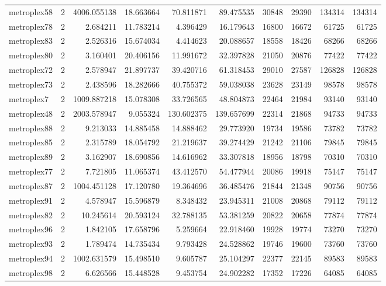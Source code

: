 \begin{longtable}{|l|r|r|r|r|r|r|r|r|r|}
metroplex58 & 2 & 4006.055138 & 18.663664 & 70.811871 & 89.475535 & 30848 & 29390 & 134314 & 134314 \\
metroplex78 & 2 & 2.684211 & 11.783214 & 4.396429 & 16.179643 & 16800 & 16672 & 61725 & 61725 \\
metroplex83 & 2 & 2.526316 & 15.674034 & 4.414623 & 20.088657 & 18558 & 18426 & 68266 & 68266 \\
metroplex80 & 2 & 3.160401 & 20.406156 & 11.991672 & 32.397828 & 21050 & 20876 & 77422 & 77422 \\
metroplex72 & 2 & 2.578947 & 21.897737 & 39.420716 & 61.318453 & 29010 & 27587 & 126828 & 126828 \\
metroplex73 & 2 & 2.438596 & 18.282666 & 40.755372 & 59.038038 & 23628 & 23149 & 98578 & 98578 \\
metroplex7 & 2 & 1009.887218 & 15.078308 & 33.726565 & 48.804873 & 22464 & 21984 & 93140 & 93140 \\
metroplex48 & 2 & 2003.578947 & 9.055324 & 130.602375 & 139.657699 & 22314 & 21868 & 94733 & 94733 \\
metroplex88 & 2 & 9.213033 & 14.885458 & 14.888462 & 29.773920 & 19734 & 19586 & 73782 & 73782 \\
metroplex85 & 2 & 2.315789 & 18.054792 & 21.219637 & 39.274429 & 21242 & 21106 & 79845 & 79845 \\
metroplex89 & 2 & 3.162907 & 18.690856 & 14.616962 & 33.307818 & 18956 & 18798 & 70310 & 70310 \\
metroplex77 & 2 & 7.721805 & 11.065374 & 43.412570 & 54.477944 & 20086 & 19918 & 75147 & 75147 \\
metroplex87 & 2 & 1004.451128 & 17.120780 & 19.364696 & 36.485476 & 21844 & 21348 & 90756 & 90756 \\
metroplex91 & 2 & 4.578947 & 15.596879 & 8.348432 & 23.945311 & 21008 & 20868 & 79112 & 79112 \\
metroplex82 & 2 & 10.245614 & 20.593124 & 32.788135 & 53.381259 & 20822 & 20658 & 77874 & 77874 \\
metroplex96 & 2 & 1.842105 & 17.658796 & 5.259664 & 22.918460 & 19928 & 19774 & 73270 & 73270 \\
metroplex93 & 2 & 1.789474 & 14.735434 & 9.793428 & 24.528862 & 19746 & 19600 & 73760 & 73760 \\
metroplex94 & 2 & 1002.631579 & 15.498510 & 9.605787 & 25.104297 & 22377 & 22145 & 89583 & 89583 \\
metroplex98 & 2 & 6.626566 & 15.448528 & 9.453754 & 24.902282 & 17352 & 17226 & 64085 & 64085 \\

\end{longtable}
